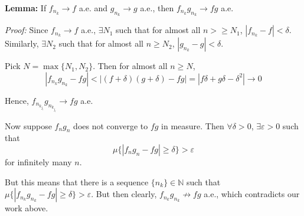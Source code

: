 \documentclass[12pt]{article}
\newcommand{\N}{\mathbb{N}}
\newcommand{\abs}[1]{\left\vert #1 \right\vert}
\newcommand{\ep}{\varepsilon}
\newcommand*{\tbf}[1]{\ifmmode\mathbf{#1}\else\textbf{#1}\fi}
\newenvironment*{proof}[1][blue]{
\begin{tcolorbox}[
    parbox=false,
    colback=#1!5!white,
    colframe=#1!75!black,
    breakable
]}
{\end{tcolorbox}}
\begin{document}
\begin{enumerate}[(a)]
        \tbf{Lemma:} If $f_{n_k} \to f$ a.e. and $g_{n_k} \to g$ a.e., then $f_{n_k}g_{n_k} \to fg$ a.e.

        \begin{proof}
            \emph{Proof:} Since $f_{n_k} \to f$ a.e., $\exists N_1$ such that for almost all $n > \geq N_1$, $\abs{f_{n_k} - f} < \delta$. Similarly, $\exists N_2$ such that for almost all $n \geq N_2$, $\abs{g_{n_k} - g} < \delta$.

            Pick $N = \max\{N_1, N_2\}$. Then for almost all $n \geq N$,
            \[\abs{f_{n_k}g_{n_k} - fg} < \abs{(f + \delta)(g + \delta) - fg} = \abs{f\delta + g\delta - \delta^2} \to 0\]
        \end{proof}

        Hence, $f_{n_{k_{j_l}}} g_{n_{k_{j_l}}} \to fg$ a.e.

        Now suppose $f_n g_n$ does not converge to $fg$ in measure. Then $\forall \delta > 0$, $\exists \ep > 0$ such that 
        \[\mu\{\abs{f_n g_n - fg} \geq \delta\} > \ep\]
        for infinitely many $n$.

        But this means that there is a sequence $\{n_k\} \in \N$ such that $\mu\{\abs{f_{n_k} g_{n_k} - fg} \geq \delta\} > \ep$. But then clearly, $f_{n_k} g_{n_k} \not\to fg$ a.e., which contradicts our work above. 
    \color{black}

\end{enumerate}
\end{document}
